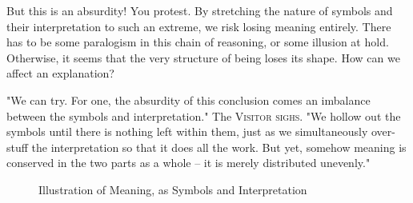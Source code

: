 But this is an absurdity! You protest. By stretching the nature of symbols and their interpretation to such an extreme, we risk losing meaning entirely. There has to be some paralogism in this chain of reasoning, or some illusion at hold. Otherwise, it seems that the very structure of being loses its shape. How can we affect an explanation?

"We can try. For one, the absurdity of this conclusion comes an imbalance between the symbols and interpretation." The \textsc{Visitor sighs}. "We hollow out the symbols until there is nothing left within them, just as we simultaneously over-stuff the interpretation so that it does all the work. But yet, somehow meaning is conserved in the two parts as a whole -- it is merely distributed unevenly."

\begin{figure}[H]
  \centering
  \caption{Illustration of Meaning, as Symbols and Interpretation}
  \label{fig:meaning}
\end{figure}


